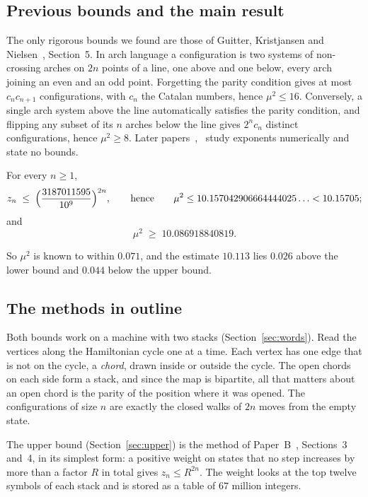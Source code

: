 \subsection{Previous bounds and the main result}

The only rigorous bounds we found are those of Guitter, Kristjansen and Nielsen~\cite{GKN}, Section~5. In arch
language a configuration is two systems of non-crossing arches on $2n$ points of a line, one above and one below,
every arch joining an even and an odd point. Forgetting the parity condition gives at most $c_nc_{n+1}$
configurations, with $c_n$ the Catalan numbers, hence $\mu^2\le16$. Conversely, a single arch system above the line
automatically satisfies the parity condition, and flipping any subset of its $n$ arches below the line gives $2^nc_n$
distinct configurations, hence $\mu^2\ge 8$. Later papers~\cite{DDGG},~\cite{DGGbicolored} study exponents
numerically and state no bounds.

\begin{theorem}\label{thm:main}
For every $n\ge1$,
\[ z_n\;\le\;\Bigl(\frac{3187011595}{10^9}\Bigr)^{2n},\qquad\text{hence}\qquad
   \mu^2\le 10.157042906664444025\ldots<10.15705 ; \]
and
\[ \mu^2\;\ge\;10.086918840819 . \]
\end{theorem}

So $\mu^2$ is known to within $0.071$, and the estimate $10.113$ lies $0.026$ above the lower bound and $0.044$
below the upper bound.

\subsection{The methods in outline}

Both bounds work on a machine with two stacks (Section~\ref{sec:words}). Read the vertices along the Hamiltonian cycle
one at a time. Each vertex has one edge that is not on the cycle, a \emph{chord}, drawn inside or outside the cycle.
The open chords on each side form a stack, and since the map is bipartite, all that matters about an open chord is the
parity of the position where it was opened. The configurations of size $n$ are exactly the closed walks of $2n$ moves
from the empty state.

The upper bound (Section~\ref{sec:upper}) is the method of Paper~B~\cite{PaperB}, Sections~3 and~4, in its simplest
form:
a positive weight on states that no step increases by more than a factor $R$ in total gives $z_n\le R^{2n}$. The
weight looks at the top twelve symbols of each stack and is stored as a table of $67$ million integers.

